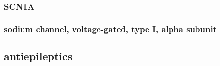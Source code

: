 \documentclass{book}
\begin{document}
\subsubsection{ SCN1A }
\subsubsection{ sodium channel, voltage-gated, type I, alpha subunit }

\subsection{ antiepileptics }
\end{document}
